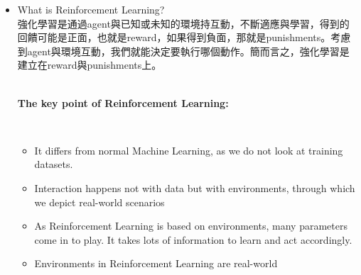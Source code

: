 \documentclass[14pt,a4paper]{report}  %
\begin{document}
\begin{itemize}
(4)\quad 多核 GPU 運算的發展 \\ Finally, the availability and commoditization of general-purpose massively parallel hardware such as GPUs provided the computing power required by deep learning methods. Specialized librariessuch as cuDNN, along with a body of academic work (such as Andrew Lavin. maxdnn: An efficient convolution kernel for deep learning with maxwell gpus,January 2015 and Andrew Lavin and Scott Gray. Fast algorithms for convolutional neural networks.2016 IEEEConference on Computer Vision and Pattern Recognition (CVPR), pages 4013–4021, 2016), produced aset of high-performance reusable deep learning kernels that enabled frameworks such as Caffe,Torch7, or TensorFlow to take advantage of these hardware accelerators.\\
\newpage
\section{強化學習}
\item What is Reinforcement Learning?\\
強化學習是通過agent與已知或未知的環境持互動，不斷適應與學習，得到的回饋可能是正面，也就是reward，如果得到負面，那就是punishments。考慮到agent與環境互動，我們就能決定要執行哪個動作。簡而言之，強化學習是建立在reward與punishments上。\\[6pt]
\\
\begin{large}
\textbf{The key point of Reinforcement Learning:}
\end{large}\\
\begin{itemize}
\item It differs from normal Machine Learning, as we do not look at
training datasets. 
\end{itemize}
\begin{itemize}
\item Interaction happens not with data but with environments,
through which we depict real-world scenarios
\end{itemize}
\begin{itemize}
\item As Reinforcement Learning is based on environments, many
parameters come in to play. It takes lots of information to learn
and act accordingly.
\end{itemize}
\begin{itemize}
\item Environments in Reinforcement Learning are real-world

\end{itemize}
\end{itemize}
\end{document}
